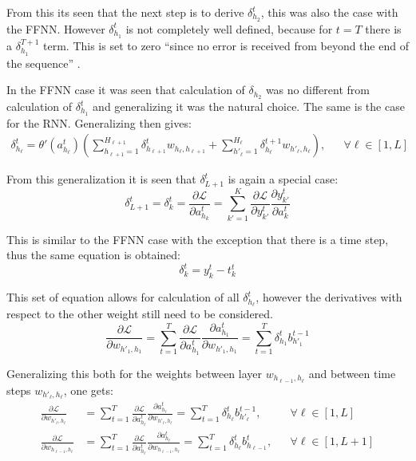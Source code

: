 From this its seen that the next step is to derive $\delta_{h_2}^t$, this was also the case with the FFNN. However $\delta_{h_1}^{t}$ is not completely well defined, because for $t = T$ there is a $\delta_{h_1}^{T+1}$ term. This is set to zero ``since no error is received from beyond the end of the sequence'' \cite{alexgraves}.

In the FFNN case it was seen that calculation of $\delta_{h_2}$ was no different from calculation of $\delta_{h_1}^{t}$ and generalizing it was the natural choice. The same is the case for the RNN. Generalizing then gives:
\begin{equation}
\begin{aligned}
\delta_{h_\ell}^t = \theta'(a_{h_\ell}^t) \left( \sum_{h_{\ell+1}=1}^{H_{\ell+1}} \delta_{h_{\ell +1}}^t w_{h_\ell, h_{\ell + 1}}
+ \sum_{h'_\ell=1}^{H_\ell} \delta_{h_\ell}^{t+1} w_{h'_\ell, h_\ell} \right), && \forall \ell \in [1, L]
\end{aligned}
\end{equation}

From this generalization it is seen that $\delta_{L+1}^t$ is again a special case:
\begin{equation}
\delta_{L+1}^t = \delta_{k}^t = \frac{\partial \mathcal{L}}{\partial a_{h_k}^t} = \sum_{k'=1}^K \frac{\partial \mathcal{L}}{\partial y_{k'}^t} \frac{\partial y_{k'}^t}{\partial a_k^t}
\end{equation}

This is similar to the FFNN case with the exception that there is a time step, thus the same equation is obtained:
\begin{equation}
\delta_{k}^t = y_k^t - t_k^t
\end{equation}

This set of equation allows for calculation of all $\delta_{h_\ell}^t$, however the derivatives with respect to the other weight still need to be considered.
\begin{equation}
\frac{\partial \mathcal{L}}{\partial w_{h'_1, h_1}} = \sum_{t=1}^T \frac{\partial \mathcal{L}}{\partial a_{h_1}^t} \frac{\partial a_{h_1}^t}{\partial w_{h'_1, h_1}} = \sum_{t=1}^T \delta_{h_1}^t b_{h'_1}^{t-1}
\end{equation}

Generalizing this both for the weights between layer $w_{h_{\ell - 1}, h_\ell}$ and between time steps $w_{h'_{\ell}, h_\ell}$, one gets:
\begin{align}
\frac{\partial \mathcal{L}}{\partial w_{h'_\ell, h_\ell}} &= \sum_{t=1}^T \frac{\partial \mathcal{L}}{\partial a_{h_\ell}^t} \frac{\partial a_{h_\ell}^t}{\partial w_{h'_\ell, h_\ell}} = \sum_{t=1}^T \delta_{h_\ell}^t b_{h'_\ell}^{t-1}, && \forall \ell \in [1, L] \\
\frac{\partial \mathcal{L}}{\partial w_{h_{\ell - 1}, h_\ell}} &= \sum_{t=1}^T \frac{\partial \mathcal{L}}{\partial a_{h_\ell}^t} \frac{\partial a_{h_\ell}^t}{\partial w_{h_{\ell-1}, h_\ell}} = \sum_{t=1}^T \delta_{h_\ell}^t b_{h_{\ell-1}}^t, && \forall \ell \in [1, L + 1] 
\end{align}
